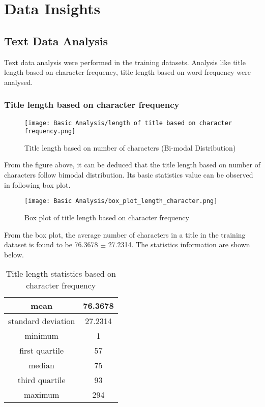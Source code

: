 \chapter{Data Insights}
\section{Text Data Analysis}
Text data analysis were performed in the training datasets. Analysis like title length based on character frequency, title length based on word frequency were analysed.

\subsection{Title length based on character frequency}
\begin{figure}[H]
    \centering
    \texttt{[image: Basic Analysis/length of title based on character frequency.png]}
    \caption{Title length based on number of characters
        (Bi-modal Distribution)}
    \label{fig:Title length based on number of characters}
\end{figure}

From the figure above, it can be deduced that the title length based on number of characters follow bimodal distribution. Its basic statistics value can be observed in following box plot.

\begin{figure}[H]
    \centering
    \texttt{[image: Basic Analysis/box\_plot\_length\_character.png]}
    \caption{Box plot of title length based on character frequency}
    \label{fig:Box plot of title length based on character frequency}
\end{figure}

From the box plot, the average number of characters in a title in the training dataset is found to be 76.3678 $\pm$ 27.2314. The statistics information are shown below.

\begin{table}[H]
    \begin{center}
        \begin{tabular}{ |c|c| }
            \hline
            mean               & 76.3678 \\
            \hline
            standard deviation & 27.2314 \\
            \hline
            minimum            & 1       \\
            \hline
            first quartile     & 57      \\
            \hline
            median             & 75      \\
            \hline
            third quartile     & 93      \\
            \hline
            maximum            & 294     \\
            \hline
        \end{tabular}
    \end{center}
    \caption{Title length statistics based on character frequency}
    \label{table:Title length statistics based on character frequency}
\end{table}

